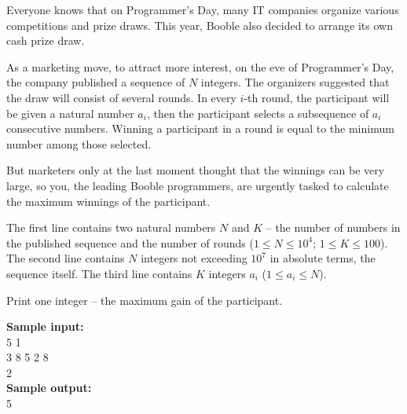 \documentclass[a4paper]{article}
\begin{document}
Everyone knows that on Programmer's Day, many IT companies organize various competitions and prize draws. This year, Booble also decided to arrange its own cash prize draw.

As a marketing move, to attract more interest, on the eve of Programmer's Day, the company published a sequence of $N$ integers. The organizers suggested that the draw will consist of several rounds. In every $i$-th round, the participant will be given a natural number $a_i$, then the participant selects a subsequence of $a_i$ consecutive numbers. Winning a participant in a round is equal to the minimum number among those selected.

But marketers only at the last moment thought that the winnings can be very large, so you, the leading Booble programmers, are urgently tasked to calculate the maximum winnings of the participant.

The first line contains two natural numbers $N$ and $K$ -- the number of numbers in the published sequence and the number of rounds ($1 \le N \le 10^4$; $1 \le K \le 100$). The second line contains $N$ integers not exceeding $10^7$ in absolute terms, the sequence itself. The third line contains $K$ integers $a_i$ ($1 \le a_i \le N$).

Print one integer -- the maximum gain of the participant.

\LINE

\noindent \textbf{Sample input:}\\
5 1\\
3 8 5 2 8\\
2\\

\noindent \textbf{Sample output:}\\
5\\
\end{document}
